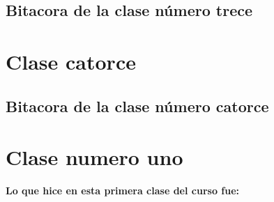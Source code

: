 \documentclass{book}
\begin{document}
\section{Bitacora de la clase número trece}
\chapter{Clase catorce}
\section{Bitacora de la clase número catorce}

\chapter{Clase numero uno}
\textbf{Lo que hice en esta primera clase del curso fue:}
\end{document}
